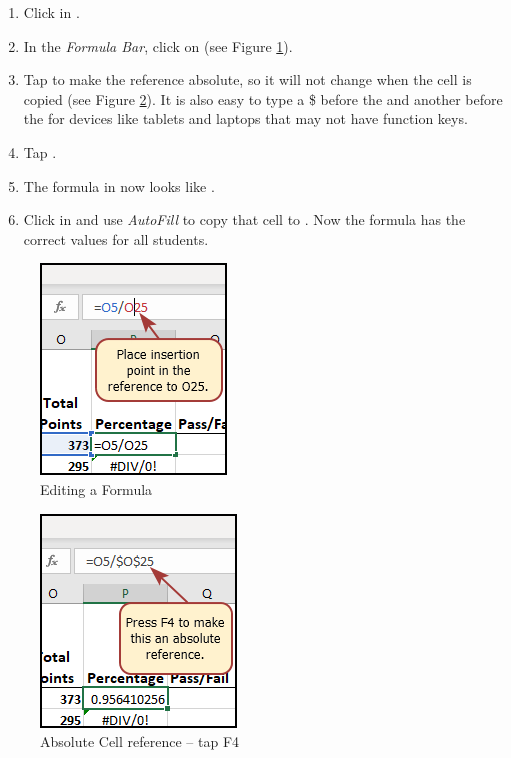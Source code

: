 \begin{enumbox}
	\begin{enumerate}
		\item Click in . 
		\item In the \textit{Formula Bar}, click on  (see Figure \ref{03:fig07}).
		\item Tap  to make the  reference absolute, so it will not change when the cell is copied (see Figure \ref{03:fig08}). It is also easy to type a \$ before the  and another before the  for devices like tablets and laptops that may not have function keys.
		\item Tap .
		\item The formula in  now looks like .
		\item Click in  and use \textit{AutoFill} to copy that cell to . Now the formula has the correct values for all students.
	\end{enumerate}
\end{enumbox}
	
\begin{figure}[H]
	\centering
	\includegraphics[width=\maxwidth{.40\linewidth}]{gfx/ch03_fig07}
	\caption{Editing a Formula}
	\label{03:fig07}
\end{figure}

\begin{figure}[H]
	\centering
	\includegraphics[width=\maxwidth{.40\linewidth}]{gfx/ch03_fig08}
	\caption{Absolute Cell reference – tap F4}
	\label{03:fig08}
\end{figure}

